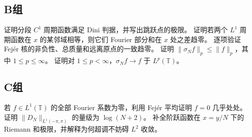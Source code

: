 \subsection*{B组}
\begin{enumerate}[label=\textbf{\thechapter.\arabic*.},resume]
证明分段 \(C^1\) 周期函数满足 Dini 判据，并写出跳跃点的极限。
证明若两个 \(L^1\) 周期函数在 \(x\) 的某邻域相等，则它们 Fourier 部分和在 \(x\) 处之差趋零。
逐项验证 Fejér 核的非负性、总质量和远离原点的一致趋零。
证明 \(\|\sigma_Nf\|_p\le\|f\|_p\)，其中 \(1\le p\le\infty\)。
证明对 \(1\le p<\infty\)，\(\sigma_Nf\to f\) 于 \(L^p(\mathbb T)\)。
\end{enumerate}
\subsection*{C组}
\begin{enumerate}[label=\textbf{\thechapter.\arabic*.},resume]
若 \(f\in L^1(\mathbb T)\) 的全部 Fourier 系数为零，利用 Fejér 平均证明 \(f=0\) 几乎处处。
证明 \(\|D_N\|_{L^1(-\pi,\pi)}\) 的量级为 \(\log(N+2)\)。
补全阶跃函数在 \(x=y/N\) 下的 Riemann 和极限，并解释为何超调不妨碍 \(L^2\) 收敛。
\end{enumerate}
